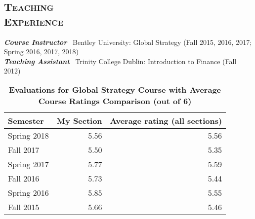 \documentclass[margin, 12pt]{res}
\begin{document}
\begin{resume}
\section{\normalfont\textsc{Teaching \\Experience}}
\textbf{\textit{Course Instructor}}~ Bentley University:
Global Strategy (Fall 2015, 2016, 2017; Spring 2016, 2017, 2018) \\
\textbf{\textit{Teaching Assistant}}~ Trinity College Dublin:
Introduction to Finance (Fall 2012)
 
%
 
\begin{table}[htbp]
  \centering
  \caption{\textbf{Evaluations for Global Strategy Course	with Average Course Ratings Comparison (out of 6)}}
    \begin{tabular}{lrr}
    \midrule
    Semester & My Section & Average rating (all sections) \\
    \midrule
    Spring 2018 & 5.56  & 5.56 \\
    Fall 2017 & 5.50  & 5.35 \\

    Spring 2017 & 5.77  & 5.59 \\
    Fall 2016 & 5.73  & 5.44 \\
    Spring 2016 & 5.85  & 5.55 \\
    Fall 2015 & 5.66  & 5.46 \\
    \bottomrule


    \end{tabular}%
    

\end{table}
\end{resume}
\end{document}
